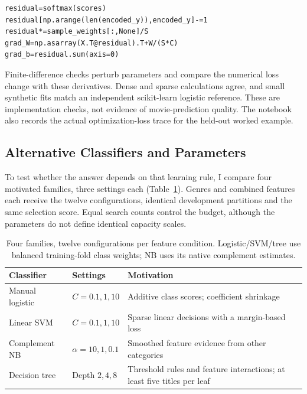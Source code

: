 \documentclass[11pt,letterpaper]{article}
\begin{document}
\begin{lstlisting}[caption={The handwritten backward pass turns class-probability errors into coefficient and intercept gradients; the full learner applies and checks its own updates.}]
residual=softmax(scores)
residual[np.arange(len(encoded_y)),encoded_y]-=1
residual*=sample_weights[:,None]/S
grad_W=np.asarray(X.T@residual).T+W/(S*C)
grad_b=residual.sum(axis=0)
\end{lstlisting}


Finite-difference checks perturb parameters and compare the numerical loss change with these derivatives. Dense and sparse calculations agree, and small synthetic fits match an independent scikit-learn logistic reference. These are implementation checks, not evidence of movie-prediction quality. The notebook also records the actual optimization-loss trace for the held-out worked example.

\subsection{Alternative Classifiers and Parameters}
To test whether the answer depends on that learning rule, I compare four motivated families, three settings each (Table~\ref{tab:menu}). Genres and combined features each receive the twelve configurations, identical development partitions and the same selection score. Equal search counts control the budget, although the parameters do not define identical capacity scales.

\begin{table}[htbp]\centering\small
\begin{tabular}{@{}p{.21\linewidth}p{.23\linewidth}p{.49\linewidth}@{}}\toprule
Classifier &Settings &Motivation\\\midrule
Manual logistic&$C=0.1,1,10$&Additive class scores; coefficient shrinkage\\
Linear SVM&$C=0.1,1,10$&Sparse linear decisions with a margin-based loss\\
Complement NB&$\alpha=10,1,0.1$&Smoothed feature evidence from other categories\\
Decision tree&Depth $2,4,8$&Threshold rules and feature interactions; at least five titles per leaf\\
\bottomrule\end{tabular}
\caption{Four families, twelve configurations per feature condition. Logistic/SVM/tree use balanced training-fold class weights; NB uses its native complement estimates.}\label{tab:menu}\end{table}
\end{document}
